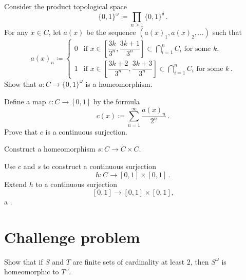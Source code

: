 \documentclass[a4paper,twoside,nols,nobib]{tufte-handout}
\begin{document}

\begin{Problem}
	\noindent
	Consider the product topological space
	\[
		\{0,1\}^{\omega} \coloneq \prod_{n\geq 1} \{0,1\}^{\delta} \period
	\]
	For any $ x\in C $, let $a(x)$ be the sequence $(a(x)_1, a(x)_2, \dots)$ such that
	\[
		a(x)_n \coloneq \begin{cases}
			0 & \text{if } {x \in \left[\dfrac{3k}{3^n},\dfrac{3k+1}{3^n}\right] \subset \displaystyle\bigcap_{i=1}^{n} C_i} \text{ for some }k \comma \\[1.5em]
			1 & \text{if } x \in \left[\dfrac{3k+2}{3^n},\dfrac{3k+3}{3^n}\right] \subset \displaystyle\bigcap_{i=1}^{n} C_i \text{ for some }k \period
		\end{cases}
	\]
	Show that $ a \colon C \to \{0,1\}^{\omega}$ is a homeomorphism.
\end{Problem}


\begin{Problem}
	\noindent
	Define a map $ c \colon C \to [0,1]$ by the formula
	\[
		c(x) \coloneq \sum_{n=1}^{\infty} \frac{a(x)_n}{2^n} \period
	\]
	Prove that $c$ is a continuous surjection.
\end{Problem}


\begin{Problem}
	\noindent
	Construct a homeomorphism $ s \colon C \to C \times C $.
\end{Problem}


\begin{Problem}
	\noindent
	Use $c $ and $ s $ to construct a continuous surjection
	\[
		h \colon C \to [0,1] \times [0,1] \period
	\]
	Extend $h$ to a continuous surjection
	\[
		[0,1] \to [0,1] \times [0,1] \comma
	\]
	a .
\end{Problem}


\section*{Challenge problem}

\begin{Problem}
	\noindent
	Show that if $S$ and $T$ are finite sets of cardinality at least $2$, then $S^{\omega} $ is homeomorphic to $T^{\omega}$.
\end{Problem}


\end{document}
